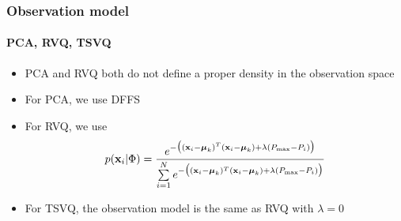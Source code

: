 \begin{frame}
\frametitle{Observation model}
\framesubtitle{PCA, RVQ, TSVQ}
\mypagenum
\begin{itemize}
\item PCA and RVQ both do not define a proper density in the observation space
\item For PCA, we use DFFS
\item For RVQ, we use
\begin{equation}
p(\mathbf{x}_i|\Phi) = \frac{e^{-\big((\mathbf{x}_i-\boldsymbol\mu_k)^T(\mathbf{x}_i-\boldsymbol\mu_k) + \lambda({P_{\textrm{max}}-P_i})\big)}} {\sum\limits_{i=1}^N e^{-\big((\mathbf{x}_i-\boldsymbol\mu_k)^T(\mathbf{x}_i-\boldsymbol\mu_k) + \lambda({P_{\textrm{max}}-P_i})\big)}}
\end{equation}
\item For TSVQ, the observation model is the same as RVQ with $\lambda=0$
\end{itemize}
\end{frame}


